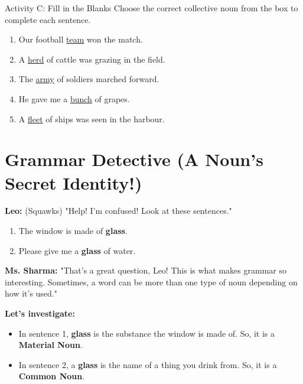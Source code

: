 \begin{activitybox}{Activity C: Fill in the Blanks}
Choose the correct collective noun from the box to complete each sentence.


\begin{enumerate}
    \item Our football \underline{team} won the match.
    \item A \underline{herd} of cattle was grazing in the field.
    \item The \underline{army} of soldiers marched forward.
    \item He gave me a \underline{bunch} of grapes.
    \item A \underline{fleet} of ships was seen in the harbour.
\end{enumerate}
\end{activitybox}

\section{Grammar Detective (A Noun's Secret Identity!)}
\begin{detectivebox}
\textbf{Leo:} (Squawks) "Help! I'm confused! Look at these sentences."
\begin{enumerate}
    \item The window is made of \textbf{glass}.
    \item Please give me a \textbf{glass} of water.
\end{enumerate}
\textbf{Ms. Sharma:} "That's a great question, Leo! This is what makes grammar so interesting. Sometimes, a word can be more than one type of noun depending on how it's used."

\textbf{Let's investigate:}
\begin{itemize}
    \item In sentence 1, \textbf{glass} is the substance the window is made of. So, it is a \textbf{Material Noun}.
    \item In sentence 2, a \textbf{glass} is the name of a thing you drink from. So, it is a \textbf{Common Noun}.
\end{itemize}
\end{detectivebox}

